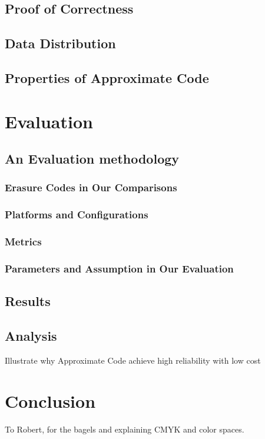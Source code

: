 \documentclass[sigconf]{acmart}
\begin{document}
\subsection{Proof of Correctness}
\subsection{Data Distribution}\label{Data Distribution}
\subsection{Properties of Approximate Code}

\section{Evaluation}\label{evaluation}
\subsection{An Evaluation methodology}
\subsubsection{Erasure Codes in Our Comparisons}
\subsubsection{Platforms and Configurations}
\subsubsection{Metrics}
\subsubsection{Parameters and Assumption in Our Evaluation}


\subsection{Results}
\subsection{Analysis}
Illustrate why Approximate Code achieve high reliability with low cost
\section{Conclusion}

%
\begin{acks}
To Robert, for the bagels and explaining CMYK and color spaces.
\end{acks}

%


\end{document}
